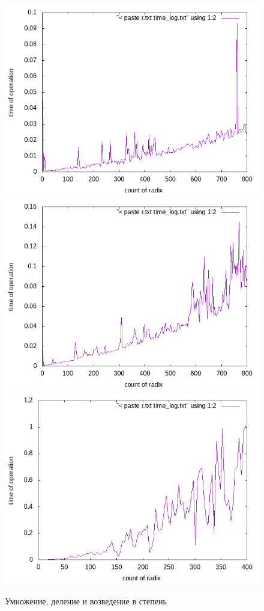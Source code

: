 \begin{figure}[h]
  \includegraphics[scale=0.3]{../plots/mul.png}
  \includegraphics[scale=0.3]{../plots/div.png}
  \includegraphics[scale=0.3]{../plots/degree.png}
  \caption{Умножение, деление и возведение в степень}
\end{figure}

\pagebreak
